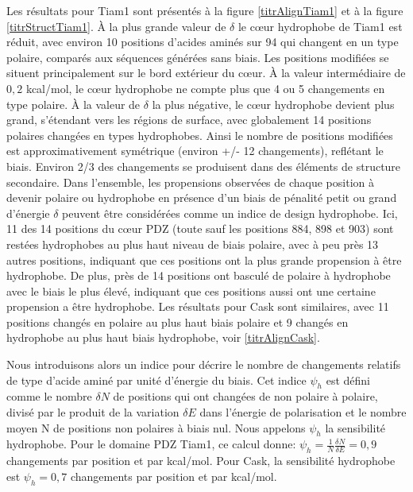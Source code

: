 Les résultats pour Tiam1 sont présentés à la figure \ref{titrAlignTiam1} et à la figure \ref{titrStructTiam1}. À la plus grande valeur de $\delta$ le cœur hydrophobe de Tiam1 est réduit, avec  environ 10 positions d'acides aminés sur 94 qui changent en un type polaire, comparés aux séquences générées sans biais. Les positions modifiées se situent principalement sur le bord extérieur du cœur. À la valeur intermédiaire de $0,2$ kcal/mol, le cœur hydrophobe ne compte plus que 4 ou 5 changements en type polaire. À la valeur de $\delta$ la plus négative, le cœur hydrophobe devient plus grand, s'étendant vers les régions de surface, avec globalement 14 positions polaires changées en types hydrophobes. Ainsi le nombre de positions modifiées est approximativement symétrique (environ +/- 12 changements), reflétant le biais. Environ 2/3 des changements se produisent dans des éléments de structure secondaire. Dans l'ensemble, les propensions observées de chaque position à devenir polaire ou hydrophobe en présence d'un biais de pénalité petit ou grand d'énergie $\delta$ peuvent être considérées comme un indice de design hydrophobe. Ici, 11 des 14 positions du cœur PDZ (toute sauf les positions 884, 898 et 903) sont restées hydrophobes au plus haut niveau de biais polaire, avec à peu près 13 autres positions, indiquant que ces positions ont la plus grande propension à être hydrophobe. De plus, près de 14 positions ont basculé de polaire à hydrophobe avec le biais le plus élevé, indiquant que ces positions aussi ont une certaine propension a être hydrophobe. Les résultats pour Cask sont similaires, avec 11 positions changés en polaire au plus haut biais polaire et 9 changés en hydrophobe au plus haut biais hydrophobe, voir \ref{titrAlignCask}.

Nous introduisons alors un indice pour décrire le nombre de changements relatifs de type d'acide aminé par unité d'énergie du biais. Cet indice  $\psi_h$ est défini comme le nombre $\delta N$ de positions qui ont changées de non polaire à polaire, divisé par le produit de la variation $\delta E$ dans l'énergie de polarisation et le nombre moyen N de positions non polaires à biais nul. Nous appelons $\psi_h$ la sensibilité hydrophobe. Pour le domaine PDZ Tiam1, ce calcul donne:
$\psi_h = \frac{1}{N} \frac{\delta N}{\delta E} = 0,9$ changements par position et par kcal/mol. Pour Cask, la sensibilité hydrophobe  est  $\psi_h = 0,7$ changements par position et par kcal/mol.


